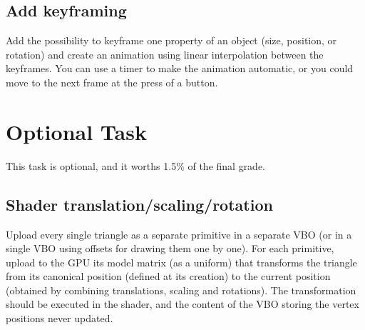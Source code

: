 \documentclass[11pt]{article}
\begin{document}
\subsection{Add keyframing}

Add the possibility to keyframe one property of an object (size,  position, or rotation) and create an animation using linear interpolation between the keyframes. You can use a timer to make the animation automatic, or you could move to the next frame at the press of a button.

\section*{Optional Task}

This task is optional, and it worths 1.5\% of the final grade.





\subsection{Shader translation/scaling/rotation}\label{sec:shader}

Upload every single triangle as a separate primitive in a separate VBO (or in a single VBO using offsets for drawing them one by one). For each primitive, upload to the GPU its model matrix (as a uniform) that transforms the triangle from its canonical position (defined at its creation) to the current position (obtained by combining translations, scaling and rotations). The transformation should be executed in the shader, and the content of the VBO storing the vertex positions never updated.

%
%
\end{document}
